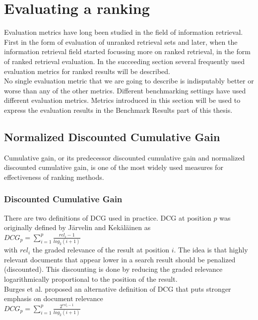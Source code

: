 \chapter{Evaluating a ranking}
Evaluation metrics have long been studied in the field of information retrieval. First in the form of evaluation of unranked retrieval sets and later, when the information retrieval field started focussing more on ranked retrieval, in the form of ranked retrieval evaluation. In the succeeding section several frequently used evaluation metrics for ranked results will be described.\\

No single evaluation metric that we are going to describe is indisputably better or worse than any of the other metrics. Different benchmarking settings have used different evaluation metrics. Metrics introduced in this section will be used to express the evaluation results in the Benchmark Results part of this thesis.
\section{Normalized Discounted Cumulative Gain}
Cumulative gain, or its predecessor discounted cumulative gain and normalized discounted cumulative gain, is one of the most widely used measures for effectiveness of ranking methods.
\subsection{Discounted Cumulative Gain}
There are two definitions of \ac{DCG} used in practice. \ac{DCG} at position $p$ was originally defined by J{\"a}rvelin and Kek{\"a}l{\"a}inen \cite{Jarvelin2002} as\\

$DCG_p = \sum\nolimits_{i=1}^p \frac{rel_i-1}{log_2(i+1)}$\\

with $rel_i$ the graded relevance of the result at position $i$. The idea is that highly relevant documents that appear lower in a search result should be penalized (discounted). This discounting is done by reducing the graded relevance  logarithmically proportional to the position of the result.\\

Burges et al. \cite{Burges2005} proposed an alternative definition of \ac{DCG} that puts stronger emphasis on document relevance\\

$DCG_p = \sum\nolimits_{i=1}^p \frac{2^{rel_i-1}}{log_2(i+1)}$\\


